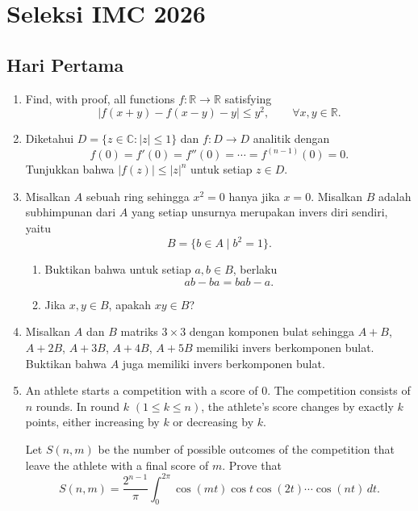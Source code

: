 \documentclass[12pt]{article}
\begin{document}
\section*{Seleksi IMC 2026}
\subsection*{Hari Pertama}

\begin{enumerate}
  \item Find, with proof, all functions $f:\mathbb{R}\to\mathbb{R}$ satisfying
        \[
          |f(x+y)-f(x-y)-y|\le y^2,
          \qquad \forall x,y\in\mathbb{R}.
        \]

  \item Diketahui
        $
          D=\{z\in\mathbb{C}:|z|\le 1\}
        $
        dan $f:D\to D$ analitik dengan
        \[
          f(0)=f'(0)=f''(0)=\cdots=f^{(n-1)}(0)=0.
        \]
        Tunjukkan bahwa
        $
          |f(z)|\le |z|^n
        $
        untuk setiap $z\in D$.

  \item Misalkan $A$ sebuah ring sehingga $x^2=0$ hanya jika $x=0$. Misalkan $B$ adalah subhimpunan dari $A$ yang setiap unsurnya merupakan invers diri sendiri, yaitu
        \[
          B=\{b\in A\mid b^2=1\}.
        \]
        \begin{enumerate}
          \item Buktikan bahwa untuk setiap $a,b\in B$, berlaku
                \[
                  ab-ba=bab-a.
                \]
          \item Jika $x,y\in B$, apakah $xy\in B$?
        \end{enumerate}

  \item Misalkan $A$ dan $B$ matriks $3\times 3$ dengan komponen bulat sehingga $A+B$, $A+2B$, $A+3B$, $A+4B$, $A+5B$ memiliki invers berkomponen bulat. Buktikan bahwa $A$ juga memiliki invers berkomponen bulat.

  \item An athlete starts a competition with a score of $0$. The competition consists of $n$ rounds. In round $k$ $(1\le k\le n)$, the athlete's score changes by exactly $k$ points, either increasing by $k$ or decreasing by $k$.

        Let $S(n,m)$ be the number of possible outcomes of the competition that leave the athlete with a final score of $m$. Prove that
        \[
          S(n,m)=\frac{2^{n-1}}{\pi}\int_0^{2\pi}\cos(mt)\cos t\cos(2t)\cdots\cos(nt)\,dt.
        \]
\end{enumerate}
\end{document}
